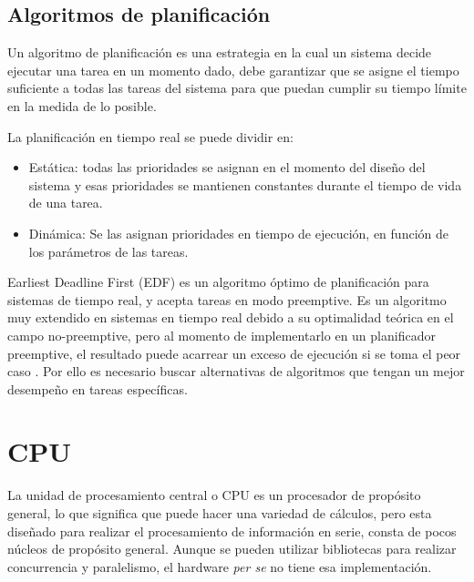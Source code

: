     \subsection{Algoritmos de planificación}
    
    Un algoritmo de planificación es una estrategia en la cual un sistema decide ejecutar una tarea en un momento dado, debe garantizar que se asigne el tiempo suficiente a todas las tareas del sistema para que puedan cumplir su tiempo límite en la medida de lo posible.
    
    La planificación en tiempo real se puede dividir en:
    \begin{itemize}
    \item Estática:  todas las prioridades se asignan en el momento del diseño del sistema y esas prioridades se mantienen constantes durante el tiempo de vida de una tarea.
    \item Dinámica: Se las asignan prioridades en tiempo de ejecución, en función de los parámetros de las tareas.
    \end{itemize}   
    
    Earliest Deadline First (EDF) es un algoritmo óptimo de planificación para sistemas de tiempo real, y acepta tareas en modo preemptive. Es un algoritmo muy extendido en sistemas en tiempo real debido a su optimalidad teórica en el campo no-preemptive, pero al momento de implementarlo en un planificador preemptive, el resultado puede acarrear un exceso de ejecución si se toma el peor caso \cite{EmbSysDes}. Por ello es necesario buscar alternativas de algoritmos que tengan un mejor desempeño en tareas específicas.


    \section{CPU}
    La unidad de procesamiento central o CPU es un procesador de propósito general, lo que significa que puede hacer una variedad de cálculos, pero esta diseñado para realizar el procesamiento de información en serie, consta de pocos núcleos de propósito general. Aunque se pueden utilizar bibliotecas para realizar concurrencia y paralelismo, el hardware \textit{per se} no tiene esa implementación.

